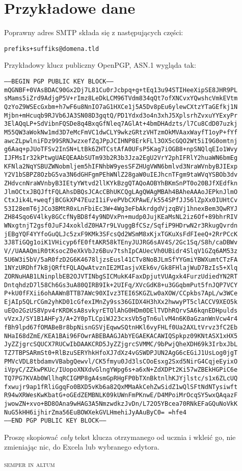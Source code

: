 \section{Przykładowe dane}

Poprawny adres SMTP składa się z następujących części:
\begin{center}\texttt{prefiks+suffiks@domena.tld}\end{center}

\noindent Przykładowy klucz publiczny OpenPGP, ASN.1 wygląda tak:
\begin{center}\tiny
\texttt{-----BEGIN PGP PUBLIC KEY BLOCK-----\\
mQGNBF+0VAsBDAC90Gx2Dj7L81Cu0rJcbpq+g+tEq13u94STIHeeXipSE8JHR9PL
sMams5iZrd9AdjgP5V+rImz8LeDkLCM96TVdm834qQt7ofXNCvxYQwshcVmkEVtm
QzYoZ9WSEcGxbm+h7wF6u8NnIO7aG1HXCe1j5A5Dv8pEu6ylewCXtzYTaGEfkj1N
Mjbn+mHcuqb9RJVb6JA3SN08D3gqtQ/PD1Ydxd3o4n3xhJ5XplsrhZvxuYYExyPr
3ElAQqLP+SdVibnFQSDe8q4BxqGfNleq7AGlAt+4bmDHAdzts/l7Cu8CdD07uzkj
M55QW3aWokNw1md3D7eMcFmVC1dwCLY9wkzGRtzVHTzmOkMVAaxWayfT1oyP+fYf
awcZLpwlniFDz99SRNJwzxefZqJPpJCIHNP8ErkFLl3OX5cGQO2Wt5iI9G0omtnj
g6Aaq+pJUoTFSv2InSN+LtBk6ZHTCstAfA0UFsP5Kag7iOGB8+npSNQlqEIo1Wvy
IJFMsIr32kPtwgUAEQEAAbSUTm93b2R3b3Jza2EgU2VrY2phIFRlY2huaWN6bmEg
KFNla2NqYSBUZWNobmljem5hIFNhbW9yesSFZHUgVWN6bmlvd3NraWVnbyBJIExp
Y2V1bSBPZ8OzbG5va3N6dGHFgmPEhWNlZ28gaW0uIEJhcnTFgm9taWVqYSBOb3dv
ZHdvcnNraWVnbyB3IEtyYWtvd2llKYkBzgQTAQoAOBYhBKmSnPT0o20BJfXEdfkn
JlmOCtxJBQJftFQLAhsDBQsJCAcCBhUKCQgLAgQWAgMBAh4BAheAAAoJEPknJlmO
CtxJik4L+weqfjBCGkXP47EuzI1iFvePVbCXPAwE/k554SPfJJ56lZpXx0IUHtCv
53I28emT6jJCo3BMtR0xLnFbiEc3W+4Wg3eFbAkrdgdVjzqBVj1hnexBem3QwRYJ
ZH84Sqo6V4lky8GCcfNyBD8f4y9NDVxPn+mudp0JujKEaMsNL2iz6Of+89bhrRIV
WNxgtnjT2gsf0JuFJ4xokldZ0HA7r9LVuggBfCSz/SqfiP9HDrwN2r3RkugQvrdn
jEBgYQF4YYfoGuQLJc5zxF9KMk3SFcsQd2WSmM8xKjxTGKuXsFdFIeeQ+2RrPCcK
3J8TiGQg1oiK1VHicyp6fE0ftAKR58kTEnyJUJRG6sAV4S/2Gc1Sq/S8h/caDBWv
V//UAAAQmiR0tKsocZ0eXkVbJz6Buv7tshIpCAUecVh0UBidr4SlqV1GZq6AM53z
5U6W3i5bV/5aR0fzD2G6K4678ljzsEusl41CTv8NoBJLmSfYYGmiYBWXumtCTzFA
1NYzURDhf7kBjQRftFQLAQwAtvznIE2MIasjvXEk6v/Gk8FHlajWuD7BzIs5+Xlq
ZORNuHAB1LNinplbEB2OJVTINbgSICMukK4FaxDpjutVUAgxk4FurzUdiedYN2RT
DntqhdzD7l58Ch6Gs3uA80QIRB9Ik+2UIFq/XVcGdK8+u3GGqbmPut5fnJQP7VCY
P+kU0fFXii6ohAAWnBTTB7AWc90XIvz3TEI6SKGZLw0aXOW/CCpkbs7ApL/w3WCe
EjAIp5QLrCGm2yhKD01cGfexIMnZy9ss36GIDX4H3hXx2hwwyPT5clACCV9XEO5k
uEQo2GzUS8Vpv4rKRDKsA8svkyrETQlAhG0HDm0DElTVDhRQrvSA6kqnEDHpulds
vVzxJ/SY1B1AHFy3/A+2Y0pTLCpiWJ23cxsVb5gTn6ulvM4n6K0aGzanWnVcw4r4
fBh9lpd67fOMABeBr8bpNisnGSVjEqwwSQtnHKl6vyFHLf0Ua2AXLtVrvz3fC2Eb
NHaI68dZmE/KEA1BAi96FOwrABEBAAGJAbYEGAEKACAWIQSpkpz09KNtASX1xHX5
JyZZjgrcSQUCX7RUCwIbDAAKCRD5JyZZjgrcSVMMC/9bPwjQheXDH69k3IrbxJbL
TZ7TBPSARmSt0+RlBzuSERYhkHfoXJ7dXz4vGSWDPJUN2AgG6cEGiJ1UsLog0jgT
PMVcVDL8tbdamvVBabgQewvl/CK5fmyu0Jd3lsCOoEsxg2Sxd5NirG4CqjeEyixO
iVpyC/ZZkwPKUc/IUopoXNXdvGlngYWpg6s+a6xN+ZdXDPt2Ki57wZBEkHGPiC6e
TQ7PG7KVAb0WllhqRCIGMP8gA4smGpRHgFP0bTXnBktnlhKJYjlstc/s1x6ZLcUQ
fxwujr9ap1fRliGgqFo0BXD5vKb6a82QxMMaAkCehZwSidZ1wQlSFtNdNTysiwft
R94wXRWesKwKbatG+oGEdZEMBNLK09kUWnFmPKnwE/D4MPoiMrOcqSY5wxQAqazF
jwowZN+xvo+BD8OAna9wHAG3A5NmzwdkzJvDn/L72O5YBcea70RNkEFaGQuNoVkK
NuG5kHH6ijhirZma56EuBOWXekGVLHmehiJyAAuByC0=
=hfe4\\
-----END PGP PUBLIC KEY BLOCK-----
}\end{center}

Proszę skopiować \emph{cały} tekst klucza otrzymanego od ucznia i wkleić go, nie zmieniając nic, do Excela lub wybranego edytora.

\vfill
\begin{center}
\LARGE \scshape semper in altum\end{center}
\vfill
